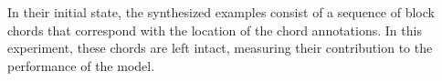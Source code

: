 
In their initial state, the synthesized examples consist of
a sequence of block chords that correspond with the location
of the chord annotations. In this experiment, these chords
are left intact, measuring their contribution to the
performance of the model.
